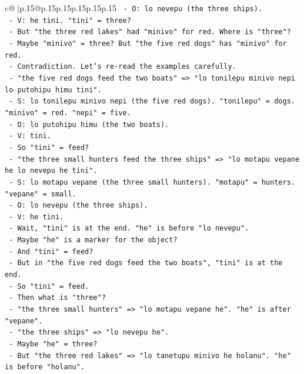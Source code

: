 \documentclass{article}
\begin{document}
{\begin{supertabular}{c@{$\;$}|p{.15\linewidth}@{}p{.15\linewidth}p{.15\linewidth}p{.15\linewidth}p{.15\linewidth}p{.15\linewidth}}
{{{\texttt{       {-} O: lo nevepu (the three ships).} \\
\texttt{       {-} V: he tini. "tini" = three?} \\
\texttt{       {-} But "the three red lakes" had "minivo" for red. Where is "three"?} \\
\texttt{       {-} Maybe "minivo" = three? But "the five red dogs" has "minivo" for red.} \\
\texttt{       {-} Contradiction. Let's re{-}read the examples carefully.} \\
\texttt{       {-} "the five red dogs feed the two boats" => "lo tonilepu minivo nepi lo putohipu himu tini".} \\
\texttt{         {-} S: lo tonilepu minivo nepi (the five red dogs). "tonilepu" = dogs. "minivo" = red. "nepi" = five.} \\
\texttt{         {-} O: lo putohipu himu (the two boats).} \\
\texttt{         {-} V: tini.} \\
\texttt{         {-} So "tini" = feed?} \\
\texttt{       {-} "the three small hunters feed the three ships" => "lo motapu vepane he lo nevepu he tini".} \\
\texttt{         {-} S: lo motapu vepane (the three small hunters). "motapu" = hunters. "vepane" = small.} \\
\texttt{         {-} O: lo nevepu (the three ships).} \\
\texttt{         {-} V: he tini.} \\
\texttt{         {-} Wait, "tini" is at the end. "he" is before "lo nevepu".} \\
\texttt{         {-} Maybe "he" is a marker for the object?} \\
\texttt{         {-} And "tini" = feed?} \\
\texttt{       {-} But in "the five red dogs feed the two boats", "tini" is at the end.} \\
\texttt{       {-} So "tini" = feed.} \\
\texttt{       {-} Then what is "three"?} \\
\texttt{       {-} "the three small hunters" => "lo motapu vepane he". "he" is after "vepane".} \\
\texttt{       {-} "the three ships" => "lo nevepu he".} \\
\texttt{       {-} Maybe "he" = three?} \\
\texttt{       {-} But "the three red lakes" => "lo tanetupu minivo he holanu". "he" is before "holanu".} \\
}}}
\end{supertabular}}
\end{document}
